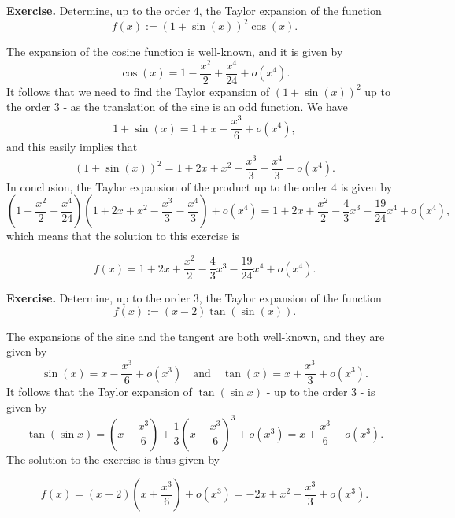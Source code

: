\documentclass[a4paper,10 pt]{report}
\newcommand{\finalanswer}[1]{%
    \begin{finalAnswer}
    \[
        #1
    \]
    \end{finalAnswer}
}
\theoremstyle{definition}
\begin{document}
\begin{exerciseBox} \textbf{Exercise.} Determine, up to the order $4$, the Taylor expansion of the function
\begin{equation*}f(x) := (1 + \sin(x))^2 \cos(x).\end{equation*}
\end{exerciseBox}

\begin{solutionBox} The expansion of the cosine function is well-known, and it is given by
\begin{equation*} \cos(x) = 1 - \frac{x^2}{2} + \frac{x^4}{24} + o(x^4) . \end{equation*}
It follows that we need to find the Taylor expansion of $(1 + \sin(x))^2$ up to the order $3$ - as the translation of the sine is an odd function. We have
\begin{equation*} 1 + \sin(x) = 1 + x - \frac{x^3}{6} + o(x^4) , \end{equation*}
and this easily implies that
\begin{equation*} (1 + \sin(x))^2 = 1 + 2x + x^2 - \frac{x^3}{3} - \frac{x^4}{3} + o(x^4). \end{equation*}
In conclusion, the Taylor expansion of the product up to the order $4$ is given by
\begin{equation*} \left(1 - \frac{x^2}{2} + \frac{x^4}{24} \right) \left(1 + 2x + x^2 - \frac{x^3}{3} - \frac{x^4}{3} \right) + o(x^4) = 1 + 2x + \frac{x^2}{2} - \frac{4}{3}x^3 - \frac{19}{24}x^4 + o(x^4), \end{equation*}
which means that the solution to this exercise is
\finalanswer{
f(x) = 1 + 2x + \frac{x^2}{2} - \frac{4}{3}x^3 - \frac{19}{24}x^4 + o(x^4).
} 
\end{solutionBox}

\begin{exerciseBox} \textbf{Exercise.} Determine, up to the order $3$, the Taylor expansion of the function
\begin{equation*}f(x) := (x - 2) \tan(\sin(x)).\end{equation*}
\end{exerciseBox}

\begin{solutionBox} The expansions of the sine and the tangent are both well-known, and they are given by
\begin{equation*} \sin(x) = x - \frac{x^3}{6} + o(x^3) \quad \text{and} \quad \tan(x) = x + \frac{x^3}{3} + o(x^3). \end{equation*}
It follows that the Taylor expansion of $\tan(\sin x )$ - up to the order $3$ - is given by
\begin{equation*} \tan(\sin x ) = \left(x - \frac{x^3}{6} \right) + \frac{1}{3} \left(x - \frac{x^3}{6} \right)^3 + o(x^3) = x + \frac{x^3}{6} + o(x^3). \end{equation*}
The solution to the exercise is thus given by
\finalanswer{
f(x) = (x - 2) \left(x + \frac{x^3}{6} \right) + o(x^3) = - 2x + x^2 - \frac{x^3}{3} + o(x^3).
} 
\end{solutionBox}
\end{document}
